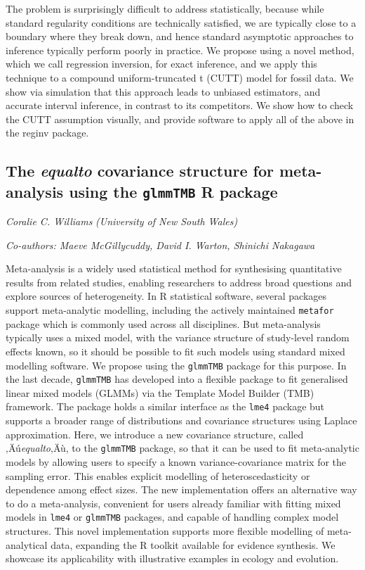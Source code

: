 \documentclass[
]{scrreprt}
\begin{document}
The problem is surprisingly difficult to address statistically, because
while standard regularity conditions are technically satisfied, we are
typically close to a boundary where they break down, and hence standard
asymptotic approaches to inference typically perform poorly in practice.
We propose using a novel method, which we call regression inversion, for
exact inference, and we apply this technique to a compound
uniform-truncated t (CUTT) model for fossil data. We show via simulation
that this approach leads to unbiased estimators, and accurate interval
inference, in contrast to its competitors. We show how to check the CUTT
assumption visually, and provide software to apply all of the above in
the reginv package.

\subsection{\texorpdfstring{The \emph{equalto} covariance structure for
meta-analysis using the \texttt{glmmTMB} R
package}{The equalto covariance structure for meta-analysis using the glmmTMB R package}}\label{the-equalto-covariance-structure-for-meta-analysis-using-the-glmmtmb-r-package}

\emph{Coralie C. Williams} \emph{(University
of New South Wales)}

\emph{Co-authors: Maeve McGillycuddy, David I. Warton, Shinichi
Nakagawa}

\setlength{\parskip}{0.5em}

Meta-analysis is a widely used statistical method for synthesising
quantitative results from related studies, enabling researchers to
address broad questions and explore sources of heterogeneity. In R
statistical software, several packages support meta-analytic modelling,
including the actively maintained \texttt{metafor} package which is
commonly used across all disciplines. But meta-analysis typically uses a
mixed model, with the variance structure of study-level random effects
known, so it should be possible to fit such models using standard mixed
modelling software. We propose using the \texttt{glmmTMB} package for
this purpose. In the last decade, \texttt{glmmTMB} has developed into a
flexible package to fit generalised linear mixed models (GLMMs) via the
Template Model Builder (TMB) framework. The package holds a similar
interface as the \texttt{lme4} package but supports a broader range of
distributions and covariance structures using Laplace approximation.
Here, we introduce a new covariance structure, called
‚Äú\emph{equalto}‚Äù, to the \texttt{glmmTMB} package, so that it can be
used to fit meta-analytic models by allowing users to specify a known
variance-covariance matrix for the sampling error. This enables explicit
modelling of heteroscedasticity or dependence among effect sizes. The
new implementation offers an alternative way to do a meta-analysis,
convenient for users already familiar with fitting mixed models in
\texttt{lme4} or \texttt{glmmTMB} packages, and capable of handling
complex model structures. This novel implementation supports more
flexible modelling of meta-analytical data, expanding the R toolkit
available for evidence synthesis. We showcase its applicability with
illustrative examples in ecology and evolution.
\end{document}
